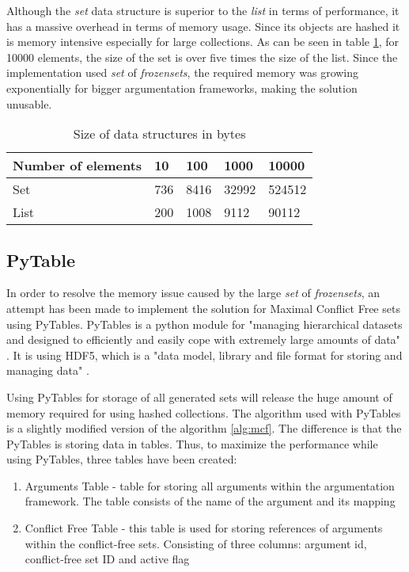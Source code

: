 Although the \textit{set} data structure is superior to the \textit{list} in terms of performance, it has a massive overhead in terms of memory usage. Since its objects are hashed it is memory intensive especially for large collections. As can be seen in table \ref{table:sizeDataStructures}, for 10000 elements, the size of the set is over five times the size of the list. Since the implementation used \textit{set} of \textit{frozensets}, the required memory was growing exponentially for bigger argumentation frameworks, making the solution unusable.

\begin{table}[h]	
	\centering
	\caption{Size of data structures in bytes}
	\label{table:sizeDataStructures}
	\begin{tabular}{lllll}
		\hline
		Number of elements & 10  & 100  & 1000  & 10000  \\ \hline
		Set                & 736 & 8416 & 32992 & 524512 \\
		List               & 200 & 1008 & 9112  & 90112 
	\end{tabular}
\end{table}


\subsection{PyTable}
In order to resolve the memory issue caused by the large \textit{set} of \textit{frozensets}, an attempt has been made to implement the solution for Maximal Conflict Free sets using PyTables. PyTables is a python module for "managing hierarchical datasets and designed to efficiently and easily cope with extremely large amounts of data" \citep{pytables}. It is using HDF5, which is a "data model, library and file format for storing and managing data" \citep{hdf5}. 

Using PyTables for storage of all generated sets will release the huge amount of memory required for using hashed collections. The algorithm used with PyTables is a slightly modified version of the algorithm \ref{alg:mcf}. The difference is that the PyTables is storing data in tables. Thus, to maximize the performance while using PyTables, three tables have been created:
\begin{enumerate}
	\item{Arguments Table - table for storing all arguments within the argumentation framework. The table consists of the name of the argument and its mapping}
	\item{Conflict Free Table - this table is used for storing references of arguments within the conflict-free sets. Consisting of three columns: argument id, conflict-free set ID and active flag}
\end{enumerate}

